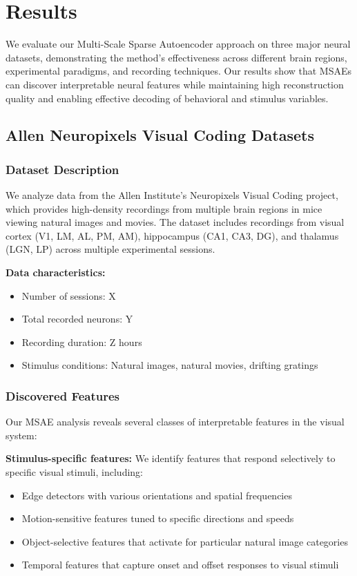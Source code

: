 \section{Results}

We evaluate our Multi-Scale Sparse Autoencoder approach on three major neural datasets, demonstrating the method's effectiveness across different brain regions, experimental paradigms, and recording techniques. Our results show that MSAEs can discover interpretable neural features while maintaining high reconstruction quality and enabling effective decoding of behavioral and stimulus variables.

\subsection{Allen Neuropixels Visual Coding Datasets}

\subsubsection{Dataset Description}

We analyze data from the Allen Institute's Neuropixels Visual Coding project, which provides high-density recordings from multiple brain regions in mice viewing natural images and movies. The dataset includes recordings from visual cortex (V1, LM, AL, PM, AM), hippocampus (CA1, CA3, DG), and thalamus (LGN, LP) across multiple experimental sessions.

\textbf{Data characteristics:}
\begin{itemize}
\item Number of sessions: X
\item Total recorded neurons: Y 
\item Recording duration: Z hours
\item Stimulus conditions: Natural images, natural movies, drifting gratings
\end{itemize}

\subsubsection{Discovered Features}

Our MSAE analysis reveals several classes of interpretable features in the visual system:

\textbf{Stimulus-specific features:} We identify features that respond selectively to specific visual stimuli, including:
\begin{itemize}
\item Edge detectors with various orientations and spatial frequencies
\item Motion-sensitive features tuned to specific directions and speeds
\item Object-selective features that activate for particular natural image categories
\item Temporal features that capture onset and offset responses to visual stimuli
\end{itemize}

